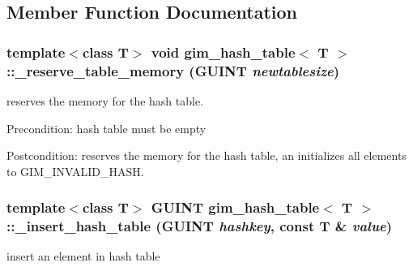 \subsection{Member Function Documentation}
\hypertarget{classgim__hash__table_4d9347e131c0e17ac2d4966c092817f8}{
\subsubsection[\_\-reserve\_\-table\_\-memory]{\setlength{\rightskip}{0pt plus 5cm}template$<$class T$>$ void {\bf gim\_\-hash\_\-table}$<$ T $>$::\_\-reserve\_\-table\_\-memory (GUINT {\em newtablesize})}}
\label{classgim__hash__table_4d9347e131c0e17ac2d4966c092817f8}


reserves the memory for the hash table. 

\begin{Desc}
\item[Precondition:]hash table must be empty \end{Desc}
\begin{Desc}
\item[Postcondition:]reserves the memory for the hash table, an initializes all elements to GIM\_\-INVALID\_\-HASH. \end{Desc}
\hypertarget{classgim__hash__table_4339a279d721d1e687b8d8063332bac8}{
\subsubsection[\_\-insert\_\-hash\_\-table]{\setlength{\rightskip}{0pt plus 5cm}template$<$class T$>$ GUINT {\bf gim\_\-hash\_\-table}$<$ T $>$::\_\-insert\_\-hash\_\-table (GUINT {\em hashkey}, \/  const T \& {\em value})}}
\label{classgim__hash__table_4339a279d721d1e687b8d8063332bac8}


insert an element in hash table 

